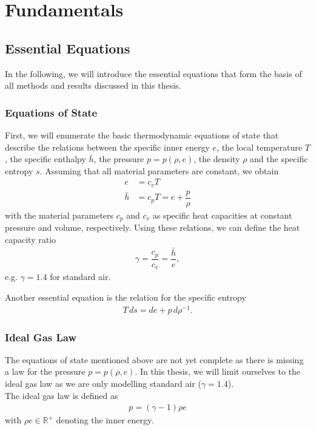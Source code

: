 \chapter{Fundamentals}
\label{fundamentals}
	\section{Essential Equations}
		In the following, we will introduce the essential equations that form the basis of all methods and results discussed in this thesis. 
		\subsection{Equations of State}
		\label{EOS}
		First, we will enumerate the basic thermodynamic equations of state that describe the relations between the specific inner energy $e$, the local temperature $T$, the specific enthalpy $\bar{h}$, the pressure $p = p (\rho , e)$, the density $\rho$ and the specific entropy $s$.
		Assuming that all material parameters are constant, we obtain
		\begin{align}
			e &= c_v T \\
			\bar{h} &= c_p T = e + \dfrac{p}{\rho}
		\end{align}
		with the material parameters $c_p$ and $c_v$ as specific heat capacities at constant pressure and volume, respectively. Using these relations, we can define the heat capacity ratio 
		\begin{align}
			\gamma = \dfrac{c_p}{c_v} = \dfrac{\bar{h}}{e}, 
		\end{align}
		e.g. $\gamma = 1.4$ for standard air.
		
		Another essential equation is the relation for the specific entropy 
		\begin{align}
			T \, ds = de + p \, d\rho^{-1}.
		\end{align}
		
		\subsection{Ideal Gas Law}
		The equations of state mentioned above are not yet complete as there is missing a law for the pressure $p = p (\rho , e)$. In this thesis, we will limit ourselves to the ideal gas law as we are only modelling standard air ($\gamma = 1.4$). \\
		The ideal gas law is defined as
		\begin{align}
			p = (\gamma - 1) \rho e
			\label{idealgas}
		\end{align}
		with $\rho e \in \mathbb{R}^+$ denoting the inner energy. \\
		
